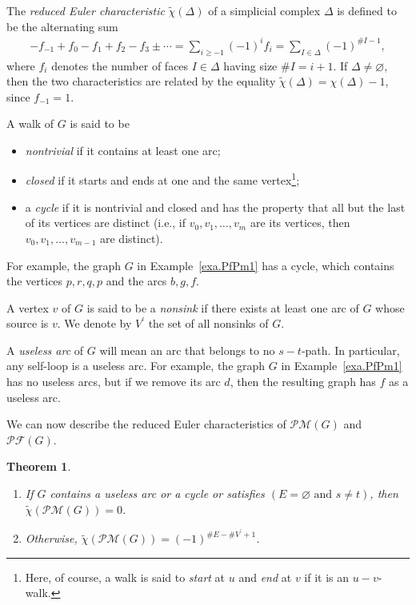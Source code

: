 \documentclass[12pt]{amsart}
\newtheorem{theorem}{Theorem}[section]
\theoremstyle{definition}
\newcommand{\tup}[1]{\left( #1 \right)}
\newcommand{\chitil}{\widetilde{\chi}}
\newcommand{\Pm}[1]{\mathcal{PM}\left(#1\right)}
\newcommand{\Pf}[1]{\mathcal{PF}\left(#1\right)}
\newcommand{\NS}{V^{\prime}}
\begin{document}
The \emph{reduced Euler characteristic} $\chitil\tup{\Delta}$ of a simplicial complex $\Delta$ is defined to be the alternating sum
\begin{align}
- f_{-1} + f_0 - f_1 + f_2 - f_3 \pm \cdots
= \sum\limits_{i \geq -1} \tup{-1}^i f_i
= \sum_{I \in \Delta} \tup{-1}^{\# I - 1} ,
\label{eq.chitil.def}
\end{align}
where $f_i$ denotes the number of faces $I \in \Delta$ having size $\# I = i+1$. If $\Delta \neq \varnothing$, then the two characteristics are related by the equality $\chitil\tup{\Delta} = \chi\tup{\Delta} -1$, since $f_{-1} = 1$.

A walk of $G$ is said to be
\begin{itemize}
\item \emph{nontrivial} if it contains at least one arc;
\item \emph{closed} if it starts and ends at one and the same vertex\footnote{Here, of course, a walk is said to \emph{start} at $u$ and \emph{end} at $v$ if it is an $u-v$-walk.};
\item a \emph{cycle} if it is nontrivial and closed and has the property that all but the last of its vertices are distinct (i.e., if $v_0, v_1, \ldots, v_m$ are its vertices, then $v_0, v_1, \ldots, v_{m-1}$ are distinct).
\end{itemize}
For example, the graph $G$ in Example~\ref{exa.PfPm1} has a cycle, which contains the vertices $p, r, q, p$ and the arcs $b, g, f$. %

A vertex $v$ of $G$ is said to be a \emph{nonsink} if there exists at least one arc of $G$ whose source is $v$.
We denote by $\NS$ the set of all nonsinks of $G$.

A \textit{useless arc} of $G$ will mean an arc that belongs to no $s-t$-path. In particular, any self-loop is a useless arc.
For example, the graph $G$ in Example~\ref{exa.PfPm1} has no useless arcs, but if we remove its arc $d$, then the resulting graph has $f$ as a useless arc.

We can now describe the reduced Euler characteristics of $\Pm{G}$ and $\Pf{G}$.

\begin{theorem}
\label{thm.PM.chitil} \hfill
\begin{enumerate}
    \item[(a)] If $G$ contains a useless arc or a cycle or satisfies $\tup{E = \varnothing \text{ and } s \neq t}$, then $\chitil\tup{\Pm{G}} = 0$.
    \item[(b)] Otherwise, $\chitil\tup{\Pm{G}} = \tup{-1}^{\# E - \# \NS + 1}$.
\end{enumerate}
\end{theorem}
\end{document}

